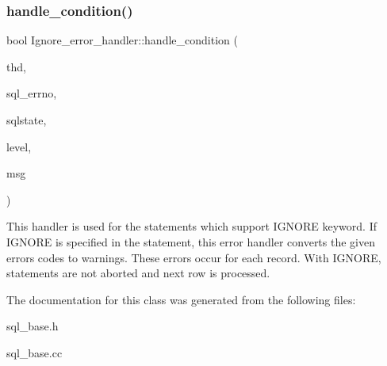 \subsubsection{\texorpdfstring{handle\+\_\+condition()}{handle\_condition()}}
{\footnotesize\ttfamily bool Ignore\+\_\+error\+\_\+handler\+::handle\+\_\+condition (\begin{DoxyParamCaption}\item[{T\+HD $\ast$}]{thd,  }\item[{uint}]{sql\+\_\+errno,  }\item[{const char $\ast$}]{sqlstate,  }\item[{\mbox{\hyperlink{classSql__condition_ab0602581e19cddb609bfe10c44be4e83}{Sql\+\_\+condition\+::enum\+\_\+severity\+\_\+level}} $\ast$}]{level,  }\item[{const char $\ast$}]{msg }\end{DoxyParamCaption})\hspace{0.3cm}{\ttfamily [virtual]}}

This handler is used for the statements which support I\+G\+N\+O\+RE keyword. If I\+G\+N\+O\+RE is specified in the statement, this error handler converts the given errors codes to warnings. These errors occur for each record. With I\+G\+N\+O\+RE, statements are not aborted and next row is processed. 

The documentation for this class was generated from the following files\+:\begin{DoxyCompactItemize}
\item 
sql\+\_\+base.\+h\item 
sql\+\_\+base.\+cc\end{DoxyCompactItemize}
